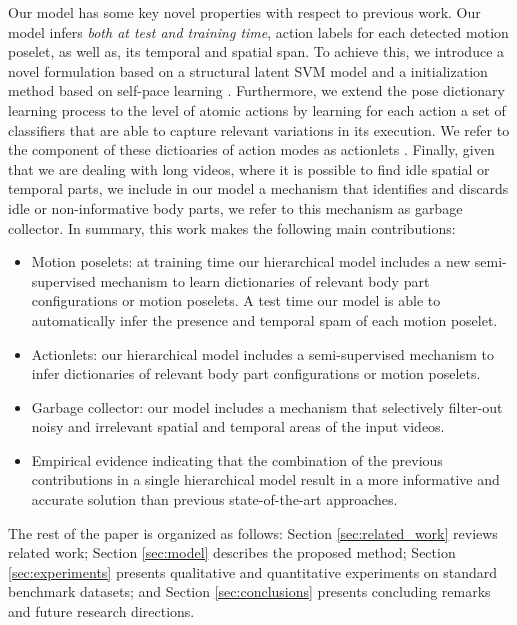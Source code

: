 Our model has some key novel properties with respect to previous work.
Our model infers \emph{both at test and training time},
action labels for each detected motion poselet, as 
well as, its temporal and spatial span. To achieve this, we introduce a novel 
formulation based on a structural latent SVM model \cite{Yu:Joachims:2010} and a 
initialization method based on self-pace learning \cite{Kumar:EtAl:2010}. 
Furthermore, we extend the pose dictionary learning process to the level of 
atomic actions by learning for each action a set of classifiers that are able to 
capture relevant variations in its execution. We refer to the component of these 
dictioaries of action modes as actionlets \cite{Wang:EtAl:2012}. Finally, given 
that we are dealing with long videos, where it is possible to find idle spatial 
or temporal parts, we include in our model a mechanism that identifies and 
discards idle or non-informative body parts, we refer to this mechanism as 
garbage collector. In summary, this work makes the following main 
contributions:

\begin{itemize}

\item Motion poselets: at training time our hierarchical model includes a 
new semi-supervised mechanism to learn dictionaries of relevant body 
part configurations or motion poselets. A test time our model is able to 
automatically infer the presence and temporal spam of each motion poselet.


\item Actionlets: our hierarchical model includes a 
semi-supervised mechanism to infer dictionaries of relevant body 
part configurations or motion poselets. 

\item Garbage collector: our model includes a mechanism that
selectively filter-out noisy and irrelevant spatial and temporal areas of the
input videos.

 \item Empirical evidence indicating that the 
combination of the previous
contributions in a single hierarchical model result in a more informative and 
accurate solution than previous state-of-the-art approaches.

\end{itemize}

The rest of the paper is organized as follows:
Section \ref{sec:related_work} reviews related work;
Section \ref{sec:model} describes the proposed method;
Section \ref{sec:experiments}  presents qualitative and quantitative experiments
on standard benchmark datasets;
and Section \ref{sec:conclusions} presents concluding remarks and future research
directions.
